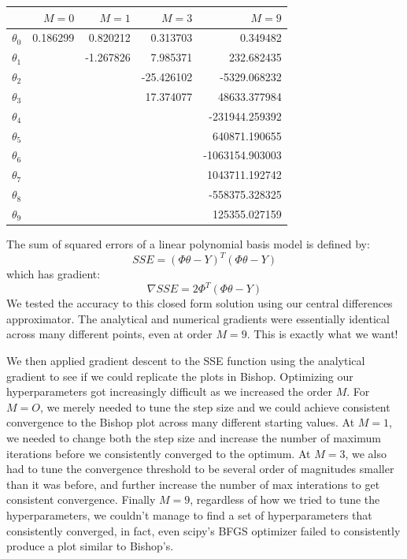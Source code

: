 \documentclass[10pt]{article}
\begin{document}
\begin{table}[ht]
\centering
{}
\begin{tabular}{lrrrr}
\toprule
{} &     $M=0$ &     $M=1$ &      $M=3$ &           $M=9$ \\
\midrule
$\theta_0$ &  0.186299 &  0.820212 &   0.313703 &        0.349482 \\
$\theta_1$ &        & -1.267826 &   7.985371 &      232.682435 \\
$\theta_2$ &        &        & -25.426102 &    -5329.068232 \\
$\theta_3$ &        &        &  17.374077 &    48633.377984 \\
$\theta_4$ &        &        &         &  -231944.259392 \\
$\theta_5$ &        &        &         &   640871.190655 \\
$\theta_6$ &        &        &         & -1063154.903003 \\
$\theta_7$ &        &        &         &  1043711.192742 \\
$\theta_8$ &        &        &         &  -558375.328325 \\
$\theta_9$ &        &        &         &   125355.027159 \\
\bottomrule
\end{tabular}
\end{table}

The sum of squared errors of a linear polynomial basis model is defined by: 
\begin{equation*}
	SSE=(\Phi \theta-Y)^T(\Phi \theta-Y) 
\end{equation*}
which has gradient:
\begin{equation*}
	\nabla SSE = 2\Phi^T(\Phi \theta-Y)
\end{equation*}
We tested the accuracy to this closed form solution using our central differences approximator. The analytical and numerical gradients were essentially identical across many different points, even at order $M=9$. This is exactly what we want!

We then applied gradient descent to the SSE function using the analytical gradient to see if we could replicate the plots in Bishop. Optimizing our hyperparameters got increasingly difficult as we increased the order $M$. For $M=O$, we merely needed to tune the step size and we could achieve consistent convergence to the Bishop plot across many different starting values. At $M=1$, we needed to change both the step size and increase the number of maximum iterations before we consistently converged to the optimum. At $M=3$, we also had to tune the convergence threshold to be several order of magnitudes smaller than it was before, and further increase the number of max interations to get consistent convergence. Finally $M=9$, regardless of how we tried to tune the hyperparameters, we couldn't manage to find a set of hyperparameters that consistently converged, in fact, even scipy's BFGS optimizer failed to consistently produce a plot similar to Bishop's.
\end{document}
